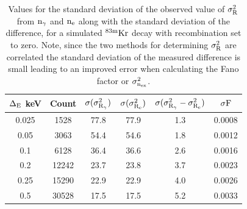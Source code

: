 \begin{table}[h!]
\begin{center}
\begin{tabular}{|c|c|c|c|c|c|}
\hline
$\rm \Delta_E$ keV & Count & $\rm \sigma (\sigma_{R_{\gamma}}^2 ) $ & $\rm \sigma (\sigma_{R_{e}}^2 )$  & $\rm \sigma (\sigma_{R_{\gamma}}^2 - \sigma_{R_{e}}^2 ) $ & $\rm \sigma F$ \\ \hline
0.025 	& 1528 		&77.8		& 77.9	  	& 1.3	&	0.0008 \\ \hline
0.05 	& 3063 		&54.4		& 54.6	  	& 1.8	&	0.0012 \\ \hline
0.1 		& 6128  	&36.4		& 36.6		& 2.6	&	0.0016  \\ \hline
0.2 		& 12242  	&23.7		& 23.8	 	& 3.7	&	0.0023 \\ \hline
0.25 	& 15290 	&22.9		& 22.9		& 4.0 	&	0.0026 \\ \hline
0.5		& 30528 	&17.5		& 17.5 		& 5.2	& 	0.0033	 \\ \hline
\end{tabular}
\caption{Values for the standard deviation of the observed value of $\rm \sigma_R^2$ from $\rm n_\gamma$ and $\rm n_e$ along with the standard deviation of the difference, for a simulated $\rm^{83m}Kr$ decay with recombination set to zero.  Note, since the two methods for determining $\rm \sigma_R^2$  are correlated the standard deviation of the measured difference is small leading to an improved error when calculating the Fano factor or $\rm \sigma_{n_{ex}}^2$.}
\label{table:Simulated_Sigmas_R_0}
\end{center}
\end{table}

